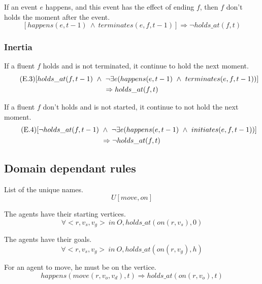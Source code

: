 If an event $e$ happens, and this event has the effect of ending $f$, then $f$ don't holds the moment after the event.
\begin{equation}
  \tag{E.2}
  [happens(e,t-1)\ \land\ terminates(e,f,t-1)] \Rightarrow \neg holds\_at(f,t)
\end{equation}

\subsubsection{Inertia}

If a fluent $f$ holds and is not terminated, it continue to hold the next moment.
\begin{multline}
  \tag{E.3}
$$[holds\_at(f,t-1)\ \land\ \neg\exists e(happens(e,t-1)\ \land\ terminates(e,f,t-1))] \\ \Rightarrow holds\_at(f,t)$$
\end{multline}

If a fluent $f$ don't holds and is not started, it continue to not hold the next moment.
\begin{multline}
  \tag{E.4}
$$[\neg holds\_at(f,t-1)\ \land\ \neg\exists e(happens(e,t-1)\ \land\ initiates(e,f,t-1))] \\ \Rightarrow\neg holds\_at(f,t)$$
\end{multline}

\subsection{Domain dependant rules}

List of the unique names.
\begin{equation}
  \tag{$\Omega$}
  U[move,on]
\end{equation}

The agents have their starting vertices.
\begin{equation}
  \tag{$\Gamma$.i}
  \forall <r,v_s,v_g>\ in\ O,holds\_at(on(r,v_s),0)
\end{equation}

The agents have their goals.
\begin{equation}
  \tag{$\Gamma$.f}
  \forall <r,v_s,v_g>\ in\ O,holds\_at(on(r,v_g),h)
\end{equation}

For an agent to move, he must be on the vertice.
\begin{equation}
  \tag{$\Psi$.1}
  happens(move(r,v_o,v_d),t) \Rightarrow holds\_at(on(r,v_o),t)
\end{equation}


